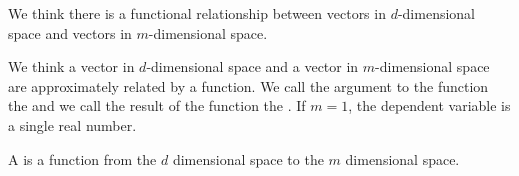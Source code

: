 

We think there
is a functional
relationship
between vectors in $d$-dimensional
space and vectors
in $m$-dimensional space.


We think a vector in
$d$-dimensional space
and a vector in $m$-dimensional
space are approximately related
by a function.
We call the argument to the
function the 
and we call the result
of the function the .
If $m = 1$, the dependent variable
is a single real number.

A  is a function
from the $d$ dimensional space
to the $m$ dimensional space.
